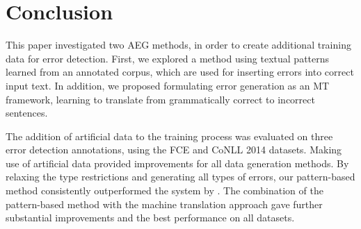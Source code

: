 \documentclass[11pt,letterpaper]{article}
\begin{document}
\section{Conclusion}

This paper investigated two AEG methods, in order to create additional training data for error detection.
First, we explored a method using textual patterns learned from an annotated corpus, which are used for inserting errors into correct input text.
In addition, we proposed formulating error generation as an MT framework, learning to translate from grammatically correct to incorrect sentences.

The addition of artificial data to the training process was evaluated on three error detection annotations, using the FCE and CoNLL 2014 datasets.
Making use of artificial data provided improvements for all data generation methods.
By relaxing the type restrictions and generating all types of errors, our pattern-based method consistently outperformed the system by .
The combination of the pattern-based method with the machine translation approach gave further substantial improvements and the best performance on all datasets.





\end{document}
